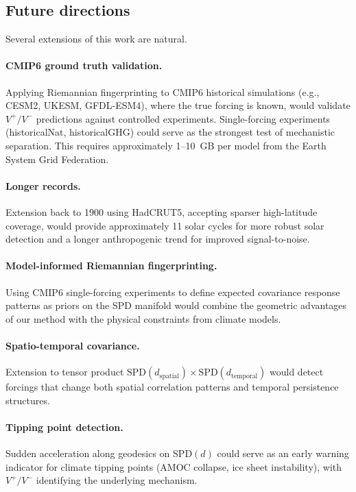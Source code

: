 \documentclass[preprint,12pt]{elsarticle}
\newcommand{\SPD}{\mathrm{SPD}}
\begin{document}
\subsection{Future directions}\label{sec:future}

Several extensions of this work are natural.

\paragraph{CMIP6 ground truth validation.}
Applying Riemannian fingerprinting to CMIP6 historical simulations (e.g., CESM2, UKESM, GFDL-ESM4), where the true forcing is known, would validate $V^+/V^-$ predictions against controlled experiments.
Single-forcing experiments (historicalNat, historicalGHG) could serve as the strongest test of mechanistic separation.
This requires approximately 1--10~GB per model from the Earth System Grid Federation.

\paragraph{Longer records.}
Extension back to 1900 using HadCRUT5, accepting sparser high-latitude coverage, would provide approximately 11 solar cycles for more robust solar detection and a longer anthropogenic trend for improved signal-to-noise.

\paragraph{Model-informed Riemannian fingerprinting.}
Using CMIP6 single-forcing experiments to define expected covariance response patterns as priors on the SPD manifold would combine the geometric advantages of our method with the physical constraints from climate models.

\paragraph{Spatio-temporal covariance.}
Extension to tensor product $\SPD(d_\mathrm{spatial}) \times \SPD(d_\mathrm{temporal})$ would detect forcings that change both spatial correlation patterns and temporal persistence structures.

\paragraph{Tipping point detection.}
Sudden acceleration along geodesics on $\SPD(d)$ could serve as an early warning indicator for climate tipping points (AMOC collapse, ice sheet instability), with $V^+/V^-$ identifying the underlying mechanism.
\end{document}
